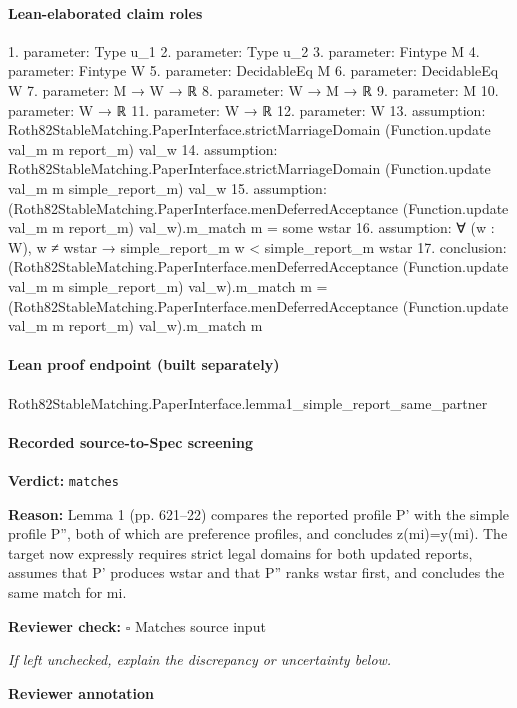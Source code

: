 \documentclass[10pt]{article}
\newcommand{\reviewerbox}{%
  \par\noindent\fbox{\parbox{0.96\linewidth}{\rule{0pt}{0.38in}}}\par
}
\newcommand{\reviewmatch}[1]{%
  \par\noindent\textbf{Reviewer check:} $\square$\; #1\par
  \noindent\emph{If left unchecked, explain the discrepancy or uncertainty below.}\par
}
\begin{document}
\paragraph{Lean-elaborated claim roles}\begin{ReviewVerbatim}
1. parameter: Type u_1
2. parameter: Type u_2
3. parameter: Fintype M
4. parameter: Fintype W
5. parameter: DecidableEq M
6. parameter: DecidableEq W
7. parameter: M → W → ℝ
8. parameter: W → M → ℝ
9. parameter: M
10. parameter: W → ℝ
11. parameter: W → ℝ
12. parameter: W
13. assumption: Roth82StableMatching.PaperInterface.strictMarriageDomain (Function.update val_m m report_m) val_w
14. assumption: Roth82StableMatching.PaperInterface.strictMarriageDomain (Function.update val_m m simple_report_m) val_w
15. assumption: (Roth82StableMatching.PaperInterface.menDeferredAcceptance (Function.update val_m m report_m) val_w).m_match m =
  some wstar
16. assumption: ∀ (w : W), w ≠ wstar → simple_report_m w < simple_report_m wstar
17. conclusion: (Roth82StableMatching.PaperInterface.menDeferredAcceptance (Function.update val_m m simple_report_m) val_w).m_match m =
  (Roth82StableMatching.PaperInterface.menDeferredAcceptance (Function.update val_m m report_m) val_w).m_match m
\end{ReviewVerbatim}

\paragraph{Lean proof endpoint (built separately)}\begin{ReviewVerbatim}
Roth82StableMatching.PaperInterface.lemma1_simple_report_same_partner
\end{ReviewVerbatim}

\paragraph{Recorded source-to-Spec screening}
\textbf{Verdict:} \texttt{matches}
\\
{\raggedright
\textbf{Reason:} Lemma 1 (pp.\allowbreak{} 621–22) compares the reported profile P' with the simple profile P'', both of which are preference profiles, and concludes z(mi)=y(mi).\allowbreak{}  The target now expressly requires strict legal domains for both updated reports, assumes that P' produces wstar and that P'' ranks wstar first, and concludes the same match for mi.\allowbreak{}
\par}
\reviewmatch{Matches source input}
\noindent\textbf{Reviewer annotation}\par
\reviewerbox
\clearpage
\hypertarget{source-claim-46db9470e122c4fe}{}
\end{document}
